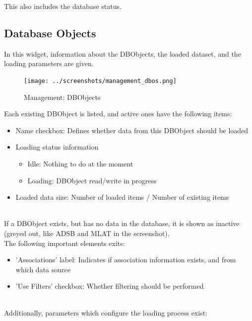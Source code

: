 This also includes the database status.

\subsection{Database Objects}
\label{sec:management_dbos}

In this widget, information about the DBObjects, the loaded dataset, and the loading parameters are given.

\begin{figure}[H]
  \center
    \texttt{[image: ../screenshots/management\_dbos.png]}
  \caption{Management: DBObjects}
\end{figure}

Each existing DBObject is listed, and active ones have the following items:

\begin{itemize}
 \item Name checkbox: Defines whether data from this DBObject should be loaded
 \item Loading status information
  \begin{itemize}
  \item Idle: Nothing to do at the moment
  \item Loading: DBObject read/write in progress
  \end{itemize}
 \item Loaded data size: Number of loaded items / Number of existing items
\end{itemize}
\ \\

If a DBObject exists, but has no data in the database, it is shown as inactive (greyed out, like ADSB and MLAT in the screenshot).\\

The following important elements exits:
\begin{itemize}
 \item 'Associations' label: Indicates if association information exists, and from which data source
 \item 'Use Filters' checkbox: Whether filtering should be performed
\end{itemize}
\ \\

Additionally, parameters which configure the loading process exist:

